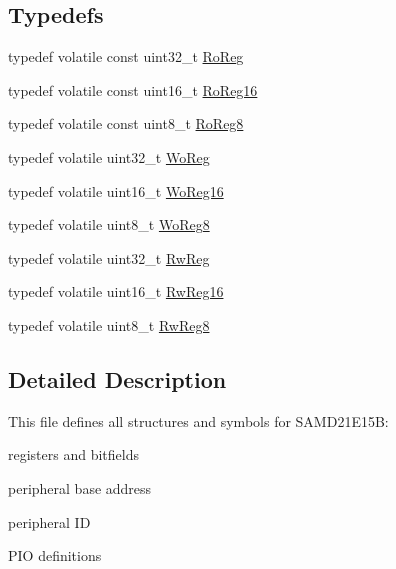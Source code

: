 \subsection*{Typedefs}
\begin{DoxyCompactItemize}
\item 
typedef volatile const uint32\+\_\+t \mbox{\hyperlink{group___s_a_m_d21_e15_b__definitions_ga5d556f8391af4141be23f7334ac9dd68}{Ro\+Reg}}
\item 
typedef volatile const uint16\+\_\+t \mbox{\hyperlink{group___s_a_m_d21_e15_b__definitions_gaebf6e33c2d49a802e06e22a95ea9d0d0}{Ro\+Reg16}}
\item 
typedef volatile const uint8\+\_\+t \mbox{\hyperlink{group___s_a_m_d21_e15_b__definitions_ga0d957f1433aaf5d70e4dc2b68288442d}{Ro\+Reg8}}
\item 
typedef volatile uint32\+\_\+t \mbox{\hyperlink{group___s_a_m_d21_e15_b__definitions_gac0f96d4e8018367b38f527007cf0eafd}{Wo\+Reg}}
\item 
typedef volatile uint16\+\_\+t \mbox{\hyperlink{group___s_a_m_d21_e15_b__definitions_ga0ab0e5f6c8301aa1c2068e511d854094}{Wo\+Reg16}}
\item 
typedef volatile uint8\+\_\+t \mbox{\hyperlink{group___s_a_m_d21_e15_b__definitions_ga5e336e5a36ee12ebeafb021108e5275b}{Wo\+Reg8}}
\item 
typedef volatile uint32\+\_\+t \mbox{\hyperlink{group___s_a_m_d21_e15_b__definitions_gacf1496e3bbe303e55f627fc7558a68c7}{Rw\+Reg}}
\item 
typedef volatile uint16\+\_\+t \mbox{\hyperlink{group___s_a_m_d21_e15_b__definitions_gacce07556c80fc352ae607f225f19fed5}{Rw\+Reg16}}
\item 
typedef volatile uint8\+\_\+t \mbox{\hyperlink{group___s_a_m_d21_e15_b__definitions_gae361754be775bb192f85821d3ab33c17}{Rw\+Reg8}}
\end{DoxyCompactItemize}


\subsection{Detailed Description}
This file defines all structures and symbols for S\+A\+M\+D21\+E15B\+:
\begin{DoxyItemize}
\item registers and bitfields
\item peripheral base address
\item peripheral ID
\item P\+IO definitions 
\end{DoxyItemize}

